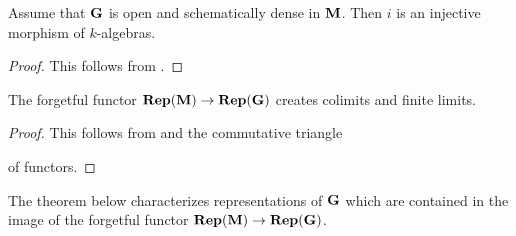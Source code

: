 \begin{fact}\label{fact:monoid_bialgebra_injects_into_group_bialgebra_if_units_are_open_and_schematically_dense}
Assume that $\mathbf{G}$ is open and schematically dense in $\mathbf{M}$. Then $i$ is an injective morphism of $k$-algebras.
\end{fact}
\begin{proof}
This follows from {\cite[Proposition 9.19]{gortz2010algebraic}}.
\end{proof}

\begin{fact}\label{fact:forgetful_from_reps_of_monoid_to_reps_of_units_creates_colimits_and_finite_limits}
The forgetful functor $\mathbf{Rep}(\mathbf{M})\rightarrow \mathbf{Rep}(\mathbf{G})$ creates colimits and finite limits.
\end{fact}
\begin{proof}
This follows from {\cite[Theorem 14.3, Theorem 14.4]{Monoid_k_functors}} and the commutative triangle
\begin{center}
\end{center}
of functors.
\end{proof}
\noindent
The theorem below characterizes representations of $\mathbf{G}$ which are contained in the image of the forgetful functor $\mathbf{Rep}(\mathbf{M})\rightarrow \mathbf{Rep}(\mathbf{G})$. 

